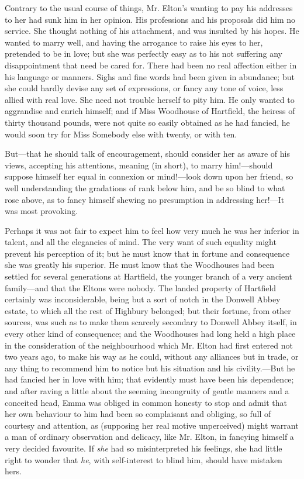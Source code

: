 Contrary to the usual course of things, Mr. Elton's wanting to pay his addresses to her had sunk him in her opinion. His professions and his proposals did him no service. She thought nothing of his attachment, and was insulted by his hopes. He wanted to marry well, and having the arrogance to raise his eyes to her, pretended to be in love; but she was perfectly easy as to his not suffering any disappointment that need be cared for. There had been no real affection either in his language or manners. Sighs and fine words had been given in abundance; but she could hardly devise any set of expressions, or fancy any tone of voice, less allied with real love. She need not trouble herself to pity him. He only wanted to aggrandise and enrich himself; and if Miss Woodhouse of Hartfield, the heiress of thirty thousand pounds, were not quite so easily obtained as he had fancied, he would soon try for Miss Somebody else with twenty, or with ten.

But---that he should talk of encouragement, should consider her as aware of his views, accepting his attentions, meaning (in short), to marry him!---should suppose himself her equal in connexion or mind!---look down upon her friend, so well understanding the gradations of rank below him, and be so blind to what rose above, as to fancy himself shewing no presumption in addressing her!---It was most provoking.

Perhaps it was not fair to expect him to feel how very much he was her inferior in talent, and all the elegancies of mind. The very want of such equality might prevent his perception of it; but he must know that in fortune and consequence she was greatly his superior. He must know that the Woodhouses had been settled for several generations at Hartfield, the younger branch of a very ancient family---and that the Eltons were nobody. The landed property of Hartfield certainly was inconsiderable, being but a sort of notch in the Donwell Abbey estate, to which all the rest of Highbury belonged; but their fortune, from other sources, was such as to make them scarcely secondary to Donwell Abbey itself, in every other kind of consequence; and the Woodhouses had long held a high place in the consideration of the neighbourhood which Mr. Elton had first entered not two years ago, to make his way as he could, without any alliances but in trade, or any thing to recommend him to notice but his situation and his civility.---But he had fancied her in love with him; that evidently must have been his dependence; and after raving a little about the seeming incongruity of gentle manners and a conceited head, Emma was obliged in common honesty to stop and admit that her own behaviour to him had been so complaisant and obliging, so full of courtesy and attention, as (supposing her real motive unperceived) might warrant a man of ordinary observation and delicacy, like Mr. Elton, in fancying himself a very decided favourite. If {\em she} had so misinterpreted his feelings, she had little right to wonder that {\em he}, with self-interest to blind him, should have mistaken hers.

